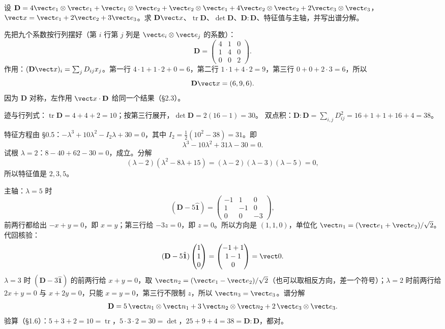 \documentclass[11pt]{ctexart}
\newcommand{\ten}[1]{\mathbf{#1}}
\newcommand{\unitd}{\hat{\ten{1}}}
\newcommand{\tr}{\operatorname{tr}}
\let\orighdr\hdr
\renewcommand{\hdr}[2]{\par\needspace{10\baselineskip}\orighdr{#1}{#2}}
\begin{document}
\clearpage
\appendix
{}

{设 $\ten D=4\vect e_1\otimes\vect e_1+\vect e_1\otimes\vect e_2+\vect e_2\otimes\vect e_1+4\vect e_2\otimes\vect e_2+2\vect e_3\otimes\vect e_3$，$\vect x=\vect e_1+2\vect e_2+3\vect e_3$。求 $\ten D\vect x$、$\tr\ten D$、$\det\ten D$、$\ten D:\ten D$、特征值与主轴，并写出谱分解。}

先把九个系数按行列摆好（第 $i$ 行第 $j$ 列是 $\vect e_i\otimes\vect e_j$ 的系数）：
\[
\ten D=\begin{pmatrix}4&1&0\\1&4&0\\0&0&2\end{pmatrix}.
\]
作用：$(\ten D\vect x)_i=\sum_jD_{ij}x_j$。第一行 $4\cdot1+1\cdot2+0=6$，第二行 $1\cdot1+4\cdot2=9$，第三行 $0+0+2\cdot3=6$，所以
\[
\ten D\vect x=(6,9,6).
\]
因为 $\ten D$ 对称，左作用 $\vect x\cdot\ten D$ 给同一个结果（§2.3）。

迹与行列式：$\tr\ten D=4+4+2=10$；按第三行展开，$\det\ten D=2(16-1)=30$。
双点积：$\ten D:\ten D=\sum_{i,j}D_{ij}^2=16+1+1+16+4=38$。

特征方程由 §0.5：$-\lambda^3+10\lambda^2-I_2\lambda+30=0$，其中 $I_2=\tfrac12(10^2-38)=31$。即
\[
\lambda^3-10\lambda^2+31\lambda-30=0 .
\]
试根 $\lambda=2$：$8-40+62-30=0$，成立。分解
\[
(\lambda-2)(\lambda^2-8\lambda+15)=(\lambda-2)(\lambda-3)(\lambda-5)=0,
\]
所以特征值是 $2,3,5$。

主轴：$\lambda=5$ 时
\[
(\ten D-5\unitd)=\begin{pmatrix}-1&1&0\\1&-1&0\\0&0&-3\end{pmatrix},
\]
前两行都给出 $-x+y=0$，即 $x=y$；第三行给 $-3z=0$，即 $z=0$。所以方向是 $(1,1,0)$，单位化 $\vect n_1=(\vect e_1+\vect e_2)/\sqrt2$。代回核验：
\[
(\ten D-5\unitd)\begin{pmatrix}1\\1\\0\end{pmatrix}
=\begin{pmatrix}-1+1\\1-1\\0\end{pmatrix}=\vect0 .
\]
$\lambda=3$ 时 $(\ten D-3\unitd)$ 的前两行给 $x+y=0$，取 $\vect n_2=(\vect e_1-\vect e_2)/\sqrt2$（也可以取相反方向，差一个符号）；$\lambda=2$ 时前两行给 $2x+y=0$ 与 $x+2y=0$，只能 $x=y=0$，第三行不限制 $z$，所以 $\vect n_3=\vect e_3$。谱分解
\[
\ten D=5\,\vect n_1\otimes\vect n_1+3\,\vect n_2\otimes\vect n_2+2\,\vect e_3\otimes\vect e_3 .
\]
验算（§1.6）：$5+3+2=10=\tr$，$5\cdot3\cdot2=30=\det$，$25+9+4=38=\ten D:\ten D$，都对。
\end{document}
